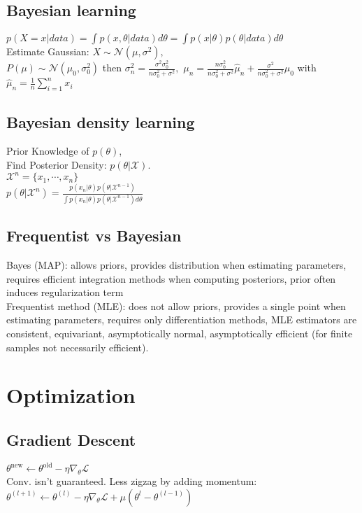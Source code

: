 \subsection*{Bayesian learning}
$p(X=x|data) = \int p(x, \theta | data) d\theta = \int p(x|\theta)p(\theta|data)d\theta$ \\
Estimate Gaussian: $X \sim \mathcal{N}(\mu, \sigma^2),$ \\
$P(\mu) \sim \mathcal{N}(\mu_0, \sigma_0^2)$ then $\sigma_n^2 = \frac{\sigma^2 \sigma_0^2}{n\sigma_0^2 + \sigma^2},$ $ \mu_n = \frac{n\sigma_0^2}{n\sigma_0^2 + \sigma^2} \hat \mu_n + \frac{\sigma^2}{n\sigma_0^2 + \sigma^2}\mu_0$ with \\
$\hat \mu_n = \frac{1}{n}\sum_{i=1}^n x_i$
\subsection*{Bayesian density learning}
Prior Knowledge of $p(\theta)$,\\
Find Posterior Density: $p(\theta|\mathcal{X})$.\\
$\mathcal{X}^n=\{x_1, \cdots, x_n\}$\\
$p(\theta|\mathcal{X}^n)=\frac{p(x_n|\theta)p(\theta|\mathcal{X}^{n-1})}{\int p(x_n|\theta)p(\theta|\mathcal{X}^{n-1}) d\theta}$


\subsection*{Frequentist vs Bayesian}
Bayes (MAP): allows priors, provides distribution when estimating parameters, requires efficient integration methods when computing posteriors, prior often induces regularization term \\
Frequentist method (MLE): does not allow priors, provides a single point when estimating parameters, requires only differentiation methods, MLE estimators are consistent, equivariant, asymptotically normal, asymptotically efficient (for finite samples not necessarily efficient). 

\section*{Optimization}
\subsection*{Gradient Descent}
$\theta^{\mathrm{new}}\leftarrow\theta^{\mathrm{old}}-\eta\nabla_{\theta}\mathcal{L}$\\
Conv. isn't guaranteed.
Less zigzag by adding momentum: $\theta^{(l+1)}\leftarrow\theta^{(l)}-\eta\nabla_{\theta}\mathcal{L}+\mu(\theta^{l}-\theta^{(l-1)})$

